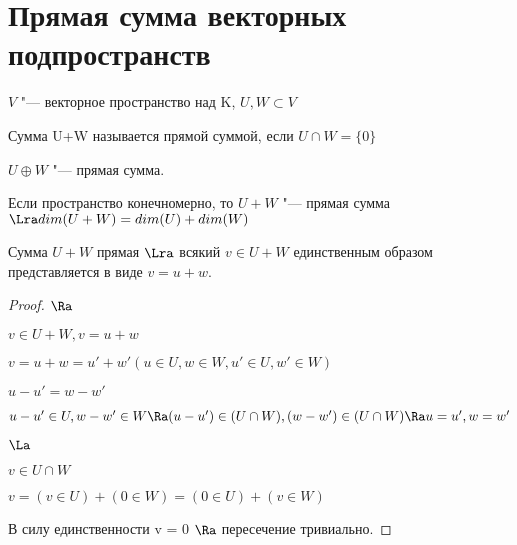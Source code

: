 ﻿\section{Прямая сумма векторных подпространств}
$V$ "--- векторное пространство над K, $U, W \subset V$
\begin{Def}
Сумма U+W называется прямой суммой, если $U \cap W = \{0\}$

$U \oplus W$ "--- прямая сумма.
\end{Def}

\begin{theorem}{}
Если пространство конечномерно, то $U + W$ "--- 
прямая сумма $\Lra dim(U + W) = dim(U) + dim(W)$

Сумма $U + W$ прямая $\Lra$ всякий $v \in U + W$ 
единственным образом представляется в виде $v = u + w$.
\end{theorem}

\begin{proof}
$\Ra$

$v \in U + W, v = u + w$

$v = u + w = u' + w'(u \in U, w \in W, u' \in U, w' \in W)$

$u - u' = w - w'$

$u - u' \in U, w - w' \in W \Ra (u - u') \in (U \cap W), (w - w') \in (U \cap W) \Ra  u = u', w = w'$ 

$\La$

$v \in U \cap W$

$v = (v \in U) + (0 \in W) = (0 \in U) + (v \in W)$

В силу единственности v = 0 $\Ra$ пересечение тривиально.
\end{proof}